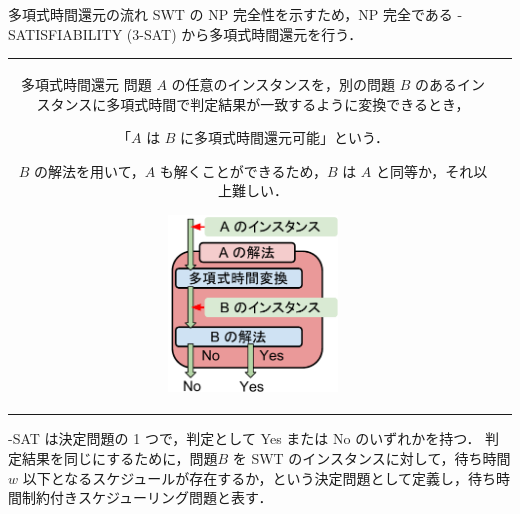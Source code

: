 \documentclass[dvipdfmx]{beamer}
\begin{document}
    \begin{frame}{多項式時間還元の流れ}
      SWT の NP 完全性を示すため，NP 完全である {-SATISFIABILITY (3-SAT)} から\alert{多項式時間還元}を行う．
      \begin{tabular}{cc}
        \begin{minipage}[]{0.6\hsize}
          \begin{block}{多項式時間還元}
            問題 $A$ の任意のインスタンスを，別の問題 $B$ のあるインスタンスに多項式時間で判定結果が一致するように変換できるとき，
            \begin{center}
              「$A$ は $B$ に多項式時間還元可能」という．
            \end{center}
            $B$ の解法を用いて，$A$ も解くことができるため，$B$ は $A$ と同等か，それ以上難しい．
          \end{block}
        \end{minipage}
        \begin{minipage}[]{0.4\hsize}
          \begin{figure}[h]
            \centering
            \includegraphics[width=4.5cm]{figure/reduction.pdf}
          \end{figure}
        \end{minipage}
        \vspace{5mm}
      \end{tabular}
      \vspace{-7mm}
      \begin{block}{}
        {-SAT} は決定問題の 1 つで，判定として Yes または No のいずれかを持つ．
        判定結果を同じにするために，問題$B$ を SWT のインスタンスに対して，待ち時間 $w$ 以下となるスケジュールが存在するか，という決定問題として定義し，\alert{待ち時間制約付きスケジューリング問題}と表す．
      \end{block}
    \end{frame}
\end{document}
